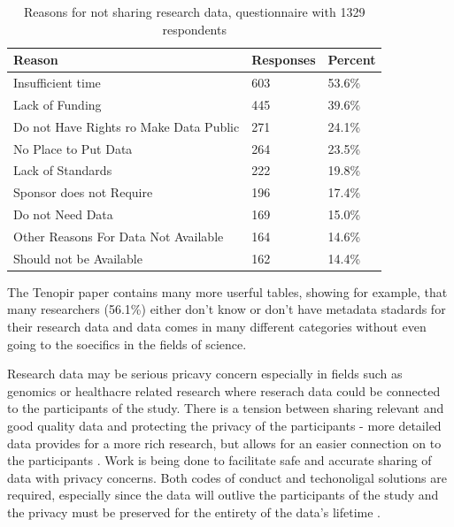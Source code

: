 \begin{table}[h]
    \centering
    \caption{Reasons for not sharing research data, questionnaire with 1329
    respondents \cite{tenopir2011data}}
    \label{table:reasons_not_sharing}
    \begin{tabular}{| l | l | l |}
      \hline
      \textbf{Reason}                           & \textbf{Responses}    & \textbf{Percent} \\
      \hline
      \rowcolor{Gray}
      Insufficient time                         & 603                   & 53.6\% \\
      \hline
      Lack of Funding                           & 445                   & 39.6\% \\
      \hline
      \rowcolor{Gray}
      Do not Have Rights ro Make Data Public    & 271                   & 24.1\% \\
      \hline
      No Place to Put Data                      & 264                   & 23.5\% \\
      \hline
      \rowcolor{Gray}
      Lack of Standards                         & 222                   & 19.8\% \\
      \hline
      Sponsor does not Require                  & 196                   & 17.4\% \\
      \hline
      \rowcolor{Gray}
      Do not Need Data                          & 169                   & 15.0\% \\
      \hline
      Other Reasons For Data Not Available      & 164                   & 14.6\% \\
      \hline
      \rowcolor{Gray}
      Should not be Available                   & 162                   & 14.4\% \\
      \hline
    \end{tabular}
\end{table}

The Tenopir paper \cite{tenopir2011data} contains many more userful tables,
showing for example, that many researchers (56.1\%) either don't know or don't have
metadata stadards for their research data and data comes in many different
categories without even going to the soecifics in the fields of science.

Research data may be serious pricavy concern especially in fields such as
genomics or healthacre related research where reserach data could be connected
to the participants of the study. There is a tension between sharing relevant
and good quality data and protecting the privacy of the participants - more
detailed data provides for a more rich research, but allows for an easier
connection on to the participants \cite{kaye2012tension}. Work is being done
to facilitate safe and accurate sharing of data with privacy concerns. Both
codes of conduct and techonoligal solutions are required, especially since the
data will outlive the participants of the study and the privacy must be
preserved for the entirety of the data's lifetime
\cite{DBLP:journals/jam/NohCJ14a} \cite{knoppers2011towards}.

